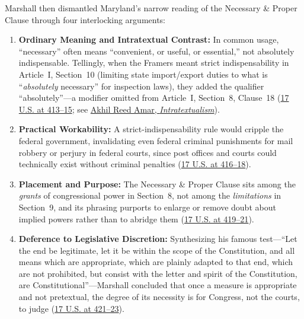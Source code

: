 \documentclass[12pt]{article}
\begin{document}
Marshall then dismantled Maryland's narrow reading of the Necessary \& Proper Clause through four interlocking arguments:
\begin{enumerate}
    \item \textbf{Ordinary Meaning and Intratextual Contrast:} In common usage, ``necessary'' often means ``convenient, or useful, or essential,'' not absolutely indispensable. Tellingly, when the Framers meant strict indispensability in Article~I, Section~10 (limiting state import/export duties to what is ``\textit{absolutely} necessary'' for inspection laws), they added the qualifier ``absolutely''---a modifier omitted from Article~I, Section~8, Clause~18 (\href{https://supreme.justia.com/cases/federal/us/17/316/}{17 U.S. at 413--15}; see \href{https://akhilamar.com/wp-content/uploads/2022/04/Intratextualism.pdf}{Akhil Reed Amar, \textit{Intratextualism}}).
    \item \textbf{Practical Workability:} A strict-indispensability rule would cripple the federal government, invalidating even federal criminal punishments for mail robbery or perjury in federal courts, since post offices and courts could technically exist without criminal penalties (\href{https://supreme.justia.com/cases/federal/us/17/316/}{17 U.S. at 416--18}).
    \item \textbf{Placement and Purpose:} The Necessary \& Proper Clause sits among the \textit{grants} of congressional power in Section~8, not among the \textit{limitations} in Section~9, and its phrasing purports to enlarge or remove doubt about implied powers rather than to abridge them (\href{https://supreme.justia.com/cases/federal/us/17/316/}{17 U.S. at 419--21}).
    \item \textbf{Deference to Legislative Discretion:} Synthesizing his famous test---``Let the end be legitimate, let it be within the scope of the Constitution, and all means which are appropriate, which are plainly adapted to that end, which are not prohibited, but consist with the letter and spirit of the Constitution, are Constitutional''---Marshall concluded that once a measure is appropriate and not pretextual, the degree of its necessity is for Congress, not the courts, to judge (\href{https://supreme.justia.com/cases/federal/us/17/316/}{17 U.S. at 421--23}).
\end{enumerate}
\end{document}

